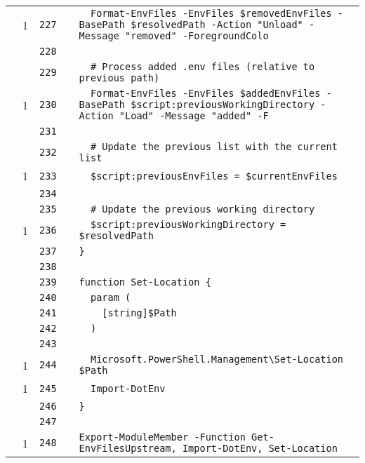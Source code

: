 \documentclass[a4paper,landscape,10pt]{article}
\begin{document}
\begin{longtable}[l]{lrrll}
\cellcolor{green} & 1 & \verb~227~ & & \verb~  Format-EnvFiles -EnvFiles $removedEnvFiles -BasePath $resolvedPath -Action "Unload" -Message "removed" -ForegroundColo~\\
\cellcolor{gray} &  & \verb~228~ & & \verb~~\\
\cellcolor{gray} &  & \verb~229~ & & \verb~  # Process added .env files (relative to previous path)~\\
\cellcolor{green} & 1 & \verb~230~ & & \verb~  Format-EnvFiles -EnvFiles $addedEnvFiles -BasePath $script:previousWorkingDirectory -Action "Load" -Message "added" -F~\\
\cellcolor{gray} &  & \verb~231~ & & \verb~~\\
\cellcolor{gray} &  & \verb~232~ & & \verb~  # Update the previous list with the current list~\\
\cellcolor{green} & 1 & \verb~233~ & & \verb~  $script:previousEnvFiles = $currentEnvFiles~\\
\cellcolor{gray} &  & \verb~234~ & & \verb~~\\
\cellcolor{gray} &  & \verb~235~ & & \verb~  # Update the previous working directory~\\
\cellcolor{green} & 1 & \verb~236~ & & \verb~  $script:previousWorkingDirectory = $resolvedPath~\\
\cellcolor{gray} &  & \verb~237~ & & \verb~}~\\
\cellcolor{gray} &  & \verb~238~ & & \verb~~\\
\cellcolor{gray} &  & \verb~239~ & & \verb~function Set-Location {~\\
\cellcolor{gray} &  & \verb~240~ & & \verb~  param (~\\
\cellcolor{gray} &  & \verb~241~ & & \verb~    [string]$Path~\\
\cellcolor{gray} &  & \verb~242~ & & \verb~  )~\\
\cellcolor{gray} &  & \verb~243~ & & \verb~~\\
\cellcolor{green} & 1 & \verb~244~ & & \verb~  Microsoft.PowerShell.Management\Set-Location $Path~\\
\cellcolor{green} & 1 & \verb~245~ & & \verb~  Import-DotEnv~\\
\cellcolor{gray} &  & \verb~246~ & & \verb~}~\\
\cellcolor{gray} &  & \verb~247~ & & \verb~~\\
\cellcolor{green} & 1 & \verb~248~ & & \verb~Export-ModuleMember -Function Get-EnvFilesUpstream, Import-DotEnv, Set-Location~\\
\end{longtable}
\end{document}
